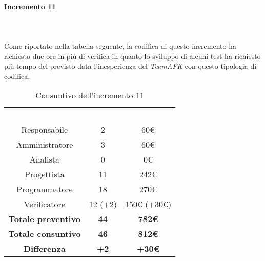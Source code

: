 \paragraph*{Incremento 11} \mbox{} \\ \mbox{} \\
Come riportato nella tabella seguente, la codifica di questo incremento ha richiesto due ore in più di verifica in quanto lo sviluppo di alcuni test ha richiesto più tempo del previsto data l'inesperienza del \textit{TeamAFK} con questo tipologia di codifica.
\begin{table}[H]
\centering\renewcommand{\arraystretch}{1.5}
\caption{Consuntivo dell'incremento 11}
\vspace{0.2cm}
\begin{tabular}{ c c c }
\rowcolor{redafk}
\textcolor{white}{\textbf{Ruolo}} & \textcolor{white}{\textbf{Ore}} &
\textcolor{white}{\textbf{Costo}}  \\
Responsabile 	& 2 & 60€  \\
Amministratore 	& 3	& 60€\\
Analista 		& 0  & 0€ \\
Progettista		& 11 & 242€ \\
Programmatore	& 18 & 270€ \\
Verificatore 	& 12 (+2) & 150€ (+30€) \\
\textbf{Totale preventivo} & \textbf{44} & \textbf{782€}  \\
\textbf{Totale consuntivo} & \textbf{46} & \textbf{812€}  \\
\rowcolor{lastrowcolor}
\textbf{Differenza} & \textbf{+2} & \textbf{+30€} \\
\end{tabular}
\end{table}

